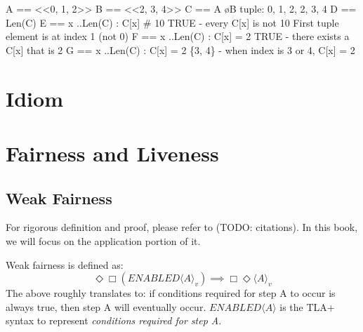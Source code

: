 \documentclass{report}
\begin{document}
\begin{tla}
A == <<0, 1, 2>>                    
B == <<2, 3, 4>>
C == A \o B                         \* tuple: 0, 1, 2, 2, 3, 4
D == Len(C)                         
E == \A x ..Len(C) : C[x] # 10 \* TRUE - every C[x] is not 10
                                    \* First tuple element is at index 1 (not 0)
F == \E x ..Len(C) : C[x] = 2  \* TRUE - there exists a C[x] that is 2
G == {x ..Len(C) : C[x] = 2}   \* \{3, 4\} - when index is 3 or 4, C[x] = 2
\end{tla}
\begin{tlatex}
%
%
%
%
\@xx{}%
%
%
\@xx{}%
%
\@xx{}%
%
%
\@xx{}%
%
\@xx{}%
%
\@xx{}%
\end{tlatex}

\chapter{Idiom}

\chapter{Fairness and Liveness}

\section{Weak Fairness}

For rigorous definition and proof, please refer to (TODO: citations). In this
book, we will focus on the application portion of it.\newline

Weak fairness is defined as:\newline
\begin{equation} 
\Diamond\Box(ENABLED\langle A \rangle _v) \implies \Box\Diamond\langle A \rangle _v
\end{equation}
The above roughly translates to: if conditions required for step A to occur is
always true, then step A will eventually occur. $ENABLED\langle A \rangle$ is
the TLA+ syntax to represent \textit{conditions required for step A}.\newline
\end{document}
